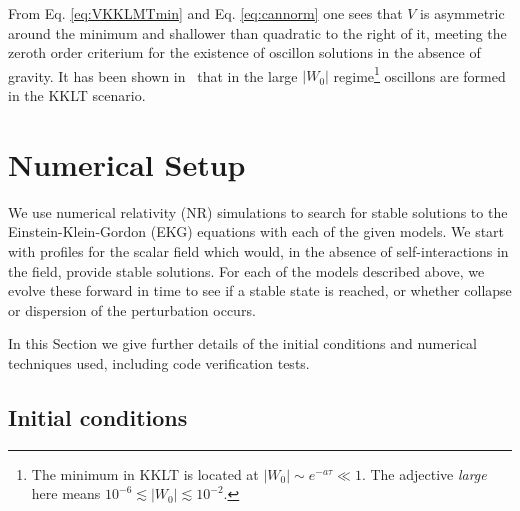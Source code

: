 \documentclass[11pt,a4paper]{article}
\begin{document}
From Eq. \eqref{eq:VKKLMTmin} and Eq. \eqref{eq:cannorm} one sees that $V$ is asymmetric around the minimum and shallower than quadratic to the right of it, meeting the zeroth order criterium for the existence of oscillon solutions in the absence of gravity. It has been shown in~\cite{Antusch:2017flz} that in the large $|W_0|$ regime\footnote{The minimum in KKLT is located at $|W_0| \sim e^{-a \tau} \ll 1$. The adjective \textit{large} here means $10^{-6} \lesssim |W_0| \lesssim 10^{-2}$.} oscillons are formed in the KKLT scenario.

\section{Numerical Setup}
\label{sec:NumericalSetup}

We use numerical relativity (NR) simulations to search for stable solutions to the Einstein-Klein-Gordon (EKG) equations with each of the given models. We start with profiles for the scalar field which would, in the absence of self-interactions in the field, provide stable solutions. For each of the models described above, we evolve these forward in time to see if a stable state is reached, or whether collapse or dispersion of the perturbation occurs.

In this Section we give further details of the initial conditions and numerical techniques used, including code verification tests.

\subsection{Initial conditions}
\end{document}
